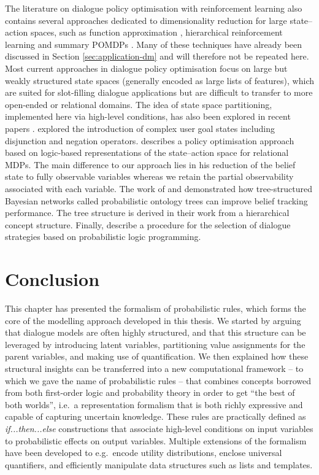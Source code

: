 The literature on dialogue policy optimisation with reinforcement learning also contains several approaches dedicated to dimensionality reduction for large state--action spaces, such as function approximation \citep{Henderson:2008}, hierarchical reinforcement learning \citep{Cuayahuitl:2010} and summary POMDPs \citep{Young:2010}.  Many of these techniques have already been discussed in Section \ref{sec:application-dm} and will therefore not be repeated here. Most current approaches in dialogue policy optimisation focus on large but weakly structured state spaces (generally encoded as large lists of features), which are suited for slot-filling dialogue applications but are difficult to transfer to more open-ended or relational domains.  The idea of state space partitioning, implemented here via high-level conditions, has also been explored in recent papers \citep[see e.g.\ ][]{Williams2010}. \cite{Crook:2010} explored the introduction of complex user goal states including disjunction and negation operators. \cite{Heriberto2011} describes a policy optimisation approach based on logic-based representations of the state--action space for relational MDPs. The main difference to our approach lies in his reduction of the belief state to fully observable variables whereas we retain the partial observability associated with each variable.  The work of \cite{Mehta:2010} and \cite{Raux2011} demonstrated how tree-structured Bayesian networks called probabilistic ontology trees can improve belief tracking performance.  The tree structure is derived in their work from a hierarchical concept structure.  Finally, \cite{neill2011} describe a procedure for the selection of dialogue strategies based on probabilistic logic programming. 

\section{Conclusion}

This chapter has presented the formalism of probabilistic rules, which forms the core of the modelling approach developed in this thesis. We started by arguing that dialogue models are often highly structured, and that this structure can be leveraged by introducing latent variables, partitioning value assignments for the parent variables, and making use of quantification. We then explained how these structural insights can be transferred into a new computational framework -- to which we gave the name of probabilistic rules -- that combines concepts borrowed from both first-order logic and probability theory in order to get ``the best of both worlds'', i.e.\ a representation formalism that is both richly expressive and capable of capturing uncertain knowledge.  These rules are practically defined as \textit{if...then...else} constructions that associate high-level conditions on input variables to probabilistic effects on output variables.  Multiple extensions of the formalism have been developed to e.g.\ encode utility distributions, enclose universal quantifiers, and efficiently manipulate data structures such as lists and templates. 

